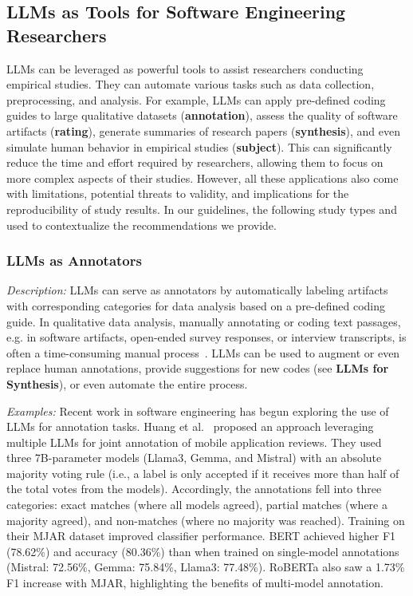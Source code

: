 \documentclass[11pt]{article}
\begin{document}
\subsection{LLMs as Tools for Software Engineering Researchers}

LLMs can be leveraged as powerful tools to assist researchers conducting empirical studies.
They can automate various tasks such as data collection, preprocessing, and analysis.
For example, LLMs can apply pre-defined coding guides to large qualitative datasets (\textbf{annotation}), assess the quality of software artifacts (\textbf{rating}), generate summaries of research papers (\textbf{synthesis}), and even simulate human behavior in empirical studies (\textbf{subject}).
This can significantly reduce the time and effort required by researchers, allowing them to focus on more complex aspects of their studies.
However, all these applications also come with limitations, potential threats to validity, and implications for the reproducibility of study results.
In our guidelines, the following study types and used to contextualize the recommendations we provide.


\subsubsection{LLMs as Annotators}

\emph{Description:} LLMs can serve as annotators by automatically labeling artifacts with corresponding categories for data analysis based on a pre-defined coding guide.
In qualitative data analysis, manually annotating or coding text passages, e.g. in software artifacts, open-ended survey responses, or interview transcripts, is often a time-consuming manual process~\cite{DBLP:journals/ase/BanoHZT24}.
LLMs can be used to augment or even replace human annotations, provide suggestions for new codes (see \textbf{LLMs for Synthesis}), or even automate the entire process.

\emph{Examples:} Recent work in software engineering has begun exploring the use of LLMs for annotation tasks.
Huang et al.~\cite{Huang2023Enhancing} proposed an approach leveraging multiple LLMs for joint annotation of mobile application reviews. 
They used three 7B-parameter models (Llama3, Gemma, and Mistral) with an absolute majority voting rule (i.e., a label is only accepted if it receives more than half of the total votes from the models). 
Accordingly, the annotations fell into three categories: exact matches (where all models agreed), partial matches (where a majority agreed), and non-matches (where no majority was reached).
Training on their MJAR dataset improved classifier performance. BERT achieved higher F1 (78.62\%) and accuracy (80.36\%) than when trained on single-model annotations (Mistral: 72.56\%, Gemma: 75.84\%, Llama3: 77.48\%). RoBERTa also saw a 1.73\% F1 increase with MJAR, highlighting the benefits of multi-model annotation.
\end{document}
